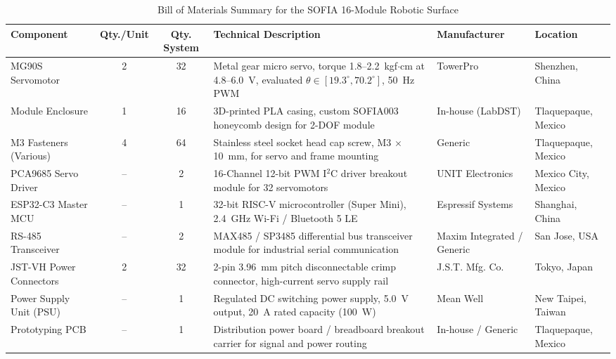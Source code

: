 \documentclass[lettersize,journal]{IEEEtran}
\begin{document}
	\begin{table}[t]
		\centering
		\caption{Bill of Materials Summary for the SOFIA 16-Module Robotic Surface}
		\label{tab:bom_sofia}
		\scriptsize
		\renewcommand{\arraystretch}{1.08}
		\begin{tabular}{p{3.2cm} c c p{5.0cm} p{2.8cm} p{2.5cm}}
			\toprule
			\textbf{Component} & \textbf{Qty./Unit} & \textbf{Qty. System} & \textbf{Technical Description} & \textbf{Manufacturer} & \textbf{Location} \\
			\midrule
			MG90S Servomotor & 2 & 32 & Metal gear micro servo, torque 1.8--2.2~kgf$\cdot$cm at 4.8--6.0~V, evaluated $\theta \in [19.3^\circ, 70.2^\circ]$, 50~Hz PWM & TowerPro & Shenzhen, China \\
			
			Module Enclosure & 1 & 16 & 3D-printed PLA casing, custom SOFIA003 honeycomb design for 2-DOF module & In-house (LabDST) & Tlaquepaque, Mexico \\
			
			M3 Fasteners (Various) & 4 & 64 & Stainless steel socket head cap screw, M3 $\times$ 10~mm, for servo and frame mounting & Generic & Tlaquepaque, Mexico \\
			
			PCA9685 Servo Driver & -- & 2 & 16-Channel 12-bit PWM I$^2$C driver breakout module for 32 servomotors & UNIT Electronics & Mexico City, Mexico \\
			
			ESP32-C3 Master MCU & -- & 1 & 32-bit RISC-V microcontroller (Super Mini), 2.4~GHz Wi-Fi / Bluetooth 5 LE & Espressif Systems & Shanghai, China \\
			
			RS-485 Transceiver & -- & 2 & MAX485 / SP3485 differential bus transceiver module for industrial serial communication & Maxim Integrated / Generic & San Jose, USA \\
			
			JST-VH Power Connectors & 2 & 32 & 2-pin 3.96~mm pitch disconnectable crimp connector, high-current servo supply rail & J.S.T. Mfg. Co. & Tokyo, Japan \\
			
			Power Supply Unit (PSU) & -- & 1 & Regulated DC switching power supply, 5.0~V output, 20~A rated capacity (100~W) & Mean Well & New Taipei, Taiwan \\
			
			Prototyping PCB & -- & 1 & Distribution power board / breadboard breakout carrier for signal and power routing & In-house / Generic & Tlaquepaque, Mexico \\
			

\end{tabular}
\end{table}
\end{document}
